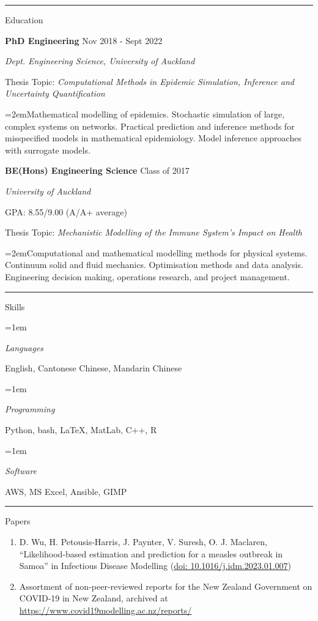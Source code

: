 \documentclass[paper=a4paper,fontsize=11pt]{scrartcl}
\newcommand{\pagerule}[1][2pt]{\noindent\rule{\textwidth}{#1}}
\newcommand{\usingfont}[2]{#1 #2 \par \normalsize \normalfont}
\newcommand{\sectionheader}[1]{\pagerule \vspace{0.05ex} \usingfont{\usefont{T1}{phv}{m}{v} \Large}{\noindent \hspace{-0.5em} #1} \vspace{0.75ex}}
\newlength{\spacebox}
\newcommand{\indented}[1][2em]{\noindent\hangindent=#1\hangafter=0}
\begin{document}
\sectionheader{Education}
\noindent \textbf{PhD Engineering} \hfill
Nov 2018 - Sept 2022 \par
\noindent \textit{Dept. Engineering Science, University of
Auckland} \par
\small Thesis Topic: \emph{Computational Methods in Epidemic Simulation,
Inference and Uncertainty Quantification} \par
\indented \small Mathematical modelling of epidemics. Stochastic
simulation of large, complex systems on networks. Practical prediction
and inference methods for misspecified models in mathematical
epidemiology. Model inference approaches with surrogate models.
\normalsize \par\par
\noindent \textbf{BE(Hons) Engineering Science} \hfill
Class of 2017 \par
\noindent \textit{University of Auckland} \par
\small GPA: 8.55/9.00 (A/A+ average) \par
\small Thesis Topic: \emph{Mechanistic Modelling of the Immune System's
Impact on Health} \par
\indented \small Computational and mathematical modelling methods for
physical systems. Continuum solid and fluid mechanics. Optimisation
methods and data analysis. Engineering decision making, operations
research, and project management.
\normalsize \par\par

\sectionheader{Skills}
\indented[1em] \parbox{\spacebox}{\textit{Languages}} 
\hspace{1.5em} English, Cantonese Chinese, Mandarin Chinese
\par
\indented[1em] \parbox{\spacebox}{\textit{Programming}} 
\hspace{1.5em} Python, bash, \LaTeX, MatLab, C++, R
\par
\indented[1em] \parbox{\spacebox}{\textit{Software}} 
\hspace{1.5em} AWS, MS Excel, Ansible, GIMP
\par

\sectionheader{Papers}
\vspace{-2ex}
\begin{enumerate}
\itemsep-0.25em
\item 
D. Wu, H. Petousis-Harris, J. Paynter, V. Suresh, O. J.
Maclaren, ``Likelihood-based estimation and prediction for a measles
outbreak in Samoa'' in Infectious Disease
Modelling (\href{https://doi.org/10.1016/j.idm.2023.01.007}{doi:
10.1016/j.idm.2023.01.007})
\item 
Assortment of non-peer-reviewed reports for the New Zealand Government
on COVID-19 in New Zealand, archived at
\url{https://www.covid19modelling.ac.nz/reports/}
\end{enumerate}
\vspace{-2ex}
\end{document}
